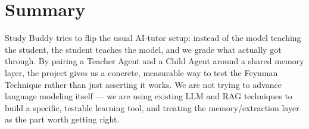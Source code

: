 \documentclass[11pt,a4paper]{article}
\newcommand{\mysection}[2]{%
    \section[#1]{#1 \hfill {\normalfont\itshape #2}}
}
\begin{document}

\mysection{Summary}{}

Study Buddy tries to flip the usual AI-tutor setup: instead of the model teaching the student, the student teaches the model, and we grade what actually got through. By pairing a Teacher Agent and a Child Agent around a shared memory layer, the project gives us a concrete, measurable way to test the Feynman Technique rather than just asserting it works. We are not trying to advance language modeling itself --- we are using existing LLM and RAG techniques to build a specific, testable learning tool, and treating the memory/extraction layer as the part worth getting right.

\end{document}
